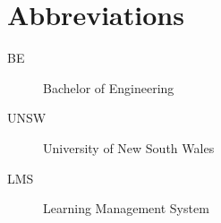 \chapter*{Abbreviations}\label{abbr}
\begin{description}
\item[BE] Bachelor of Engineering
\item[UNSW] University of New South Wales
\item[LMS] Learning Management System

\end{description}
